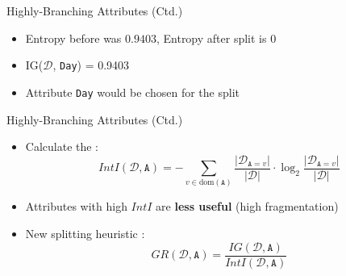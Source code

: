\begin{frame}{Highly-Branching Attributes (Ctd.)}{}
	\vspace*{-2mm}
	
	\vspace*{-5mm}
	\begin{itemize}
		\item Entropy before was $0.9403$, Entropy after split is $0$
		\item IG($\mathcal{D}$, \texttt{Day}) = 0.9403
		\item Attribute \texttt{Day} would be chosen for the split 
	\end{itemize}
\end{frame}


\begin{frame}{Highly-Branching Attributes (Ctd.)}{}
	\begin{itemize}
		\item Calculate the :
		\begin{equation}
			IntI(\mathcal{D}, \texttt{A})
				= -\sum_{v \in \text{dom}(\texttt{A})} \frac{\vert \mathcal{D}_{\texttt{A}=v} \vert}{\vert \mathcal{D} \vert} \cdot
					\log_2 \frac{\vert \mathcal{D}_{\texttt{A}=v} \vert}{\vert \mathcal{D} \vert}
		\end{equation}
		\item Attributes with high $IntI$ are \textbf{less useful} (high fragmentation)
		\item New splitting heuristic :
		\begin{equation}
			GR(\mathcal{D}, \texttt{A}) = \frac{IG(\mathcal{D}, \texttt{A})}{IntI(\mathcal{D}, \texttt{A})}
		\end{equation}
	\end{itemize}
\end{frame}


